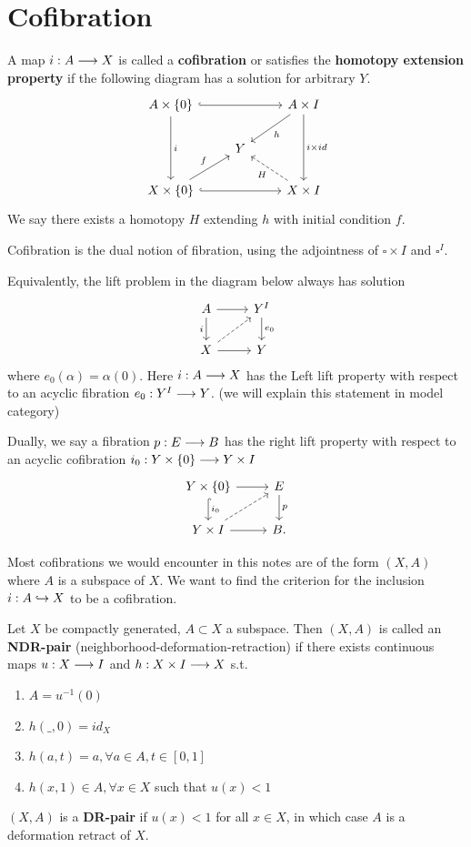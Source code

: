 \documentclass[11pt]{book} %
\begin{document}
\section{Cofibration}
\begin{definition}
A map $i: A\longrightarrow X$ is called a \textbf{cofibration} or satisfies the \textbf{homotopy extension property} if the following diagram has a solution for arbitrary $Y$.
$$
\begin{tikzcd}
A\times \{0\} \arrow[dd, "i"] \arrow[rr, hook] &  & A\times I \arrow[dd, "i\times id"] \arrow[ld, "h"] \\
 & Y &  \\
X\times\{0\} \arrow[rr, hook] \arrow[ru,"f"] &  & X\times I \arrow[lu, "H",dashed]
\end{tikzcd}
$$
We say there exists a homotopy $H$ extending $h$ with initial condition $f$.
\end{definition}
Cofibration is the dual notion of fibration, using the adjointness of $\square\times I$ and $\square^I$.

Equivalently, the lift problem in the diagram below always has  solution
$$
\begin{tikzcd}
A \arrow[d, "i"'] \arrow[r] & Y^I \arrow[d, "e_0"] \\
X \arrow[r] \arrow[ru, dashed] & Y
\end{tikzcd}
$$
where $e_0(\alpha)=\alpha(0)$. Here $i:A\longrightarrow X$ has the Left lift property with respect to an acyclic fibration $e_0:Y^I\longrightarrow Y$. (we will explain this statement in model category)

Dually, we say a fibration $p:E\longrightarrow B$ has the right lift property with respect to an acyclic cofibration $i_0: Y\times\{0\}\longrightarrow Y\times I$
$$
\begin{tikzcd}
Y\times\{0\} \arrow[d, "i_0",hook] \arrow[r] & E \arrow[d, "p"] \\
Y\times I \arrow[r] \arrow[ru, dashed] & B.
\end{tikzcd}
$$

Most cofibrations we would encounter in this notes are of the form $(X,A)$ where $A$ is a subspace of $X$. We want to find the criterion for the inclusion $i: A\hookrightarrow X$ to be a cofibration.
\begin{definition}
Let $X$ be compactly generated, $A \subset X$ a subspace. Then $(X,A)$ is called an \textbf{NDR-pair} (neighborhood-deformation-retraction) if there exists continuous maps $u: X\longrightarrow I$ and $h: X\times I\longrightarrow X$ s.t.
\begin{enumerate}
\item $A=u^{-1}(0)$
\item $h(\_, 0)=id_X$
\item $h(a,t)=a,\forall a\in A, t\in [0,1]$
\item $h(x,1)\in A,\forall x\in X$ such that $u(x)<1$
\end{enumerate}
$(X,A)$ is a \textbf{DR-pair} if $u(x) < 1$ for all $x \in X$, in which case $A$ is a deformation retract of $X$. 
\end{definition}
\end{document}
